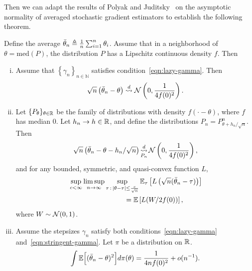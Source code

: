 Then we can adapt the results of Polyak and Juditsky~\cite{PolyakJu92}
on the asymptotic normality of averaged stochastic gradient estimators
to establish the following theorem.
\begin{thm}
  \label{thm:sgd}
  Define the average $\bar{\theta}_n \triangleq \frac{1}{n}
  \sum_{i = 1}^n \theta_i$. Assume
  that in a neighborhood
  of $\theta = \mbox{med}(P)$,
  the distribution $P$ has a Lipschitz continuous density $f$.
  Then
  \begin{enumerate}[(i)]
  \item \label{item:normal-sgd}
    Assume that $\left\{ \gamma_n \right\}_{n\in \mathbb N}$ satisfies
    condition~\eqref{eqn:lazy-gamma}.
    Then
    \begin{equation*}
      \sqrt{n}\left( \bar{\theta}_n - \theta\right)
      \stackrel{d}{\rightsquigarrow} \mathcal{N}\left(0,\frac{1}{4 f(0)^2}\right).
    \end{equation*}
  \item \label{item:sgd-regular}
    Let $\{P_\theta\}_{\theta \in \mathbb{R}}$ be the family of distributions
    with density $f(\cdot - \theta)$, where $f$ has median 0.
    Let $h_n \to h \in \mathbb{R}$, and define the distributions
    $P_n = P_{\theta + h_n/\sqrt{n}}^n$. Then
    \begin{equation*}
      \sqrt{n}\left(\bar{\theta}_n - \theta - h_n / \sqrt{n}\right)
      \mathop{\stackrel{d}{\rightsquigarrow}}_{P_n}
      \mathcal{N}\left(0, \frac{1}{4 f(0)^2}\right),
    \end{equation*}
    and for any bounded, symmetric, and quasi-convex function $L$,
    \begin{align} 
      & \sup_{c < \infty} \limsup_{n \to \infty}
      \sup_{\tau\,:\,|\theta-\tau| \leq \frac{c}{\sqrt{n} }}
      \mathbb{E}_\tau \left[ L\left( \sqrt{n}(\bar{\theta}_{n} - \tau) \right) \right] \nonumber 
      \\
      & \qquad \qquad \qquad \qquad = \mathbb E \left[L(W/ 2 f(0)) \right],
        \label{eq:attaining_LAM}
    \end{align}
    where $W \sim \mathcal{N}(0,1)$. 
  \item \label{item:sgd-ms-convergence} Assume the stepsizes $\gamma_n$
    satisfy both conditions~\eqref{eqn:lazy-gamma}
    and~\eqref{eqn:stringent-gamma}. Let
    $\pi$ be a distribution on $\mathbb{R}$.
    \begin{equation*}
      \int \mathbb{E}\Big[( \bar{\theta}_n - \theta )^2\Big] d\pi(\theta)
      = \frac{1}{4 n f(0)^2} + o(n^{-1}). 
    \end{equation*}
  \end{enumerate}
\end{thm}

